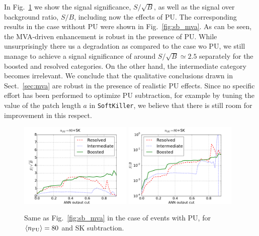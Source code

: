 In Fig.~\ref{fig:sb_mva_PU} we show the signal significance,
$S/\sqrt{B}$, as well as the signal over background ratio,
$S/B$, including now the effects of PU.
%
The corresponding results in the case without PU were shown in
Fig.~\ref{fig:sb_mva}.
%
As can be seen, the MVA-driven enhancement is robust in the
presence of PU.
%
While unsurprisingly there us a degradation as compared to the case wo PU,
we still manage to achieve a signal significance of
around $S/\sqrt{B}\simeq 2.5$ separately for the boosted and resolved
categories.
%
On the other hand, the intermediate category becomes irrelevant.
%
We conclude that the qualitative conclusions drawn in
Sect.~\ref{sec:mva} are robust in the presence
of realistic PU effects.
%
Since no specific effort has been performed to
optimize PU subtraction, for example by tuning the value
of the patch length $a$ in {\tt SoftKiller}, we believe that
there is
still room for improvement in this respect.


\begin{figure}[t]
\begin{center}
\includegraphics[width=0.48\textwidth]{plots/ssb_SKPU80.pdf}
\includegraphics[width=0.48\textwidth]{plots/sb_SKPU80.pdf}
\caption{\small 
Same as Fig.~\ref{fig:sb_mva} in the
case of events with PU, for
 $\left\langle n_{\rm PU}\right\rangle=80$ 
  and SK subtraction.
}
\label{fig:sb_mva_PU}
\end{center}
\end{figure}

